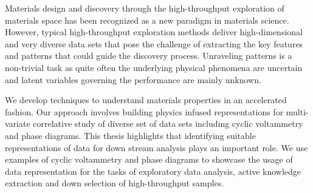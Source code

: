 Materials design and discovery through the high-throughput exploration of materials space has been recognized as a new paradigm in materials science. However, typical high-throughput exploration methods deliver high-dimensional and very diverse data sets that pose the challenge of extracting the key features and patterns that could guide the discovery process. Unraveling patterns is a non-trivial task as quite often the underlying physical phenomena are uncertain and latent variables governing the performance are mainly unknown. 

We develop techniques to understand materials properties in an accelerated fashion. 
Our approach involves building physics infused representations for multi-variate correlative study of diverse set of data sets including cyclic voltammetry and phase diagrams. 
This thesis highlights that identifying suitable representations of data for down stream analysis plays an important role.
We use examples of cyclic voltammetry and phase diagrams to showcase the usage of data representation for the tasks of exploratory data analysis, active knowledge extraction and down selection of high-throughput samples. 